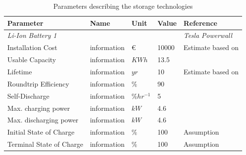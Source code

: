 \documentclass[
	11pt,								%
	DIV10,								%
	a4paper,         					%
	oneside,							%
	headheight=20pt,					%
	footheight=20pt,					%
    parskip=full,						%
    listof=totoc,						%
	bibliography=totoc,					%
	index=totoc,						%
]{scrartcl}
\begin{document}
\begin{table}[H]
	\centering
	\caption{Parameters describing the storage technologies}
	\begin{tabular}{lllll}
		\hline
		\textbf{Parameter}			& \textbf{Name}			& \textbf{Unit}			& \textbf{Value}	&\textbf{Reference}     \\ \hline
		\textit{Li-Ion Battery 1} & & & &\textit{Tesla Powerwall} \\
		Installation Cost              & information     	& \euro 				& 10000				& Estimate based on \cite{PowerwallTesla2018}   \\
		Usable Capacity				   & information 		& $KWh$ 				& 13.5 				& \cite{PowerwallTesla2018} 	\\
		Lifetime			               & information     	& $yr$  				& 10 				& Estimate based on \cite{PowerwallTesla2018} \\
		Roundtrip Efficiency           & information     	& $\%$  				& 90				& \cite{PowerwallTesla2018}   \\
		Self-Discharge		           & information     	& $\%hr^{-1}$  			& 5					& \cite{LAUINGER201624}   \\	
		Max. charging power            & information    	& $kW$  				& 4.6 				& \cite{PowerwallTesla2018}      \\
		Max. discharging power         & information     	& $kW$   				& 4.6 				& \cite{PowerwallTesla2018}      \\
		Initial State of Charge        & information     	& $\%$  				& 100 				& Assumption   \\
		Terminal State of Charge       & information     	& $\%$  				& 100 				& Assumption   \\
		

\end{tabular}
\end{table}
\end{document}
